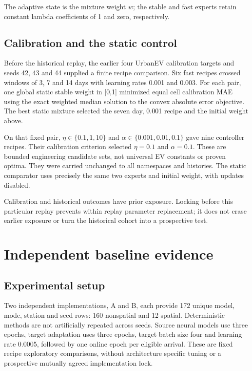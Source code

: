 \documentclass[pdflatex,iicol,sn-mathphys-num]{sn-jnl}
\begin{document}
The adaptive state is the mixture weight $w$; the stable and fast experts retain constant lambda coefficients of 1 and zero, respectively.

\subsection{Calibration and the static control}

Before the historical replay, the earlier four UrbanEV calibration targets and seeds 42, 43 and 44 supplied a finite recipe comparison. Six fast recipes crossed windows of 3, 7 and 14 days with learning rates 0.001 and 0.003. For each pair, one global static stable weight in [0,1] minimized equal cell calibration MAE using the exact weighted median solution to the convex absolute error objective. The best static mixture selected the seven day, 0.001 recipe and the initial weight above.

On that fixed pair, $\eta\in\{0.1,1,10\}$ and $\alpha\in\{0.001,0.01,0.1\}$ gave nine controller recipes. Their calibration criterion selected $\eta=0.1$ and $\alpha=0.1$. These are bounded engineering candidate sets, not universal EV constants or proven optima. They were carried unchanged to all namespaces and histories. The static comparator uses precisely the same two experts and initial weight, with updates disabled.

Calibration and historical outcomes have prior exposure. Locking before this particular replay prevents within replay parameter replacement; it does not erase earlier exposure or turn the historical cohort into a prospective test.

\section{Independent baseline evidence}

\subsection{Experimental setup}

Two independent implementations, A and B, each provide 172 unique model, mode, station and seed rows: 160 nonspatial and 12 spatial. Deterministic methods are not artificially repeated across seeds. Source neural models use three epochs, target adaptation uses three epochs, target batch size four and learning rate 0.0005, followed by one online epoch per eligible arrival. These are fixed recipe exploratory comparisons, without architecture specific tuning or a prospective mutually agreed implementation lock.
\end{document}
